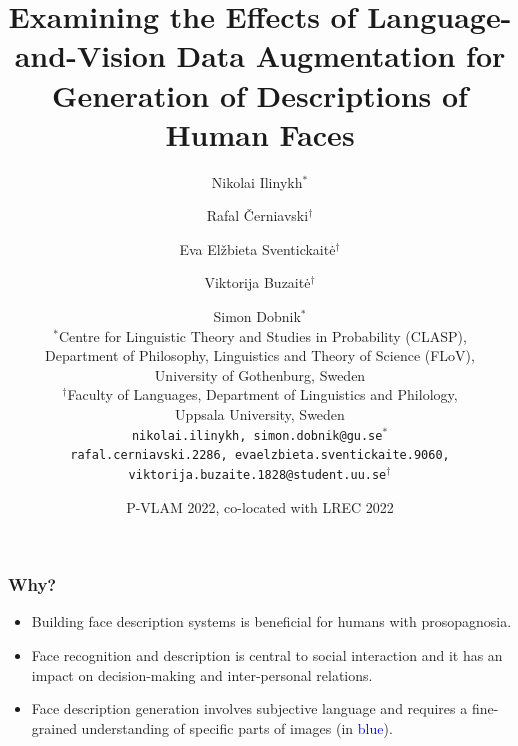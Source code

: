 \documentclass[aspectratio=1610]{beamer} %
\title{Examining the Effects of Language-and-Vision Data Augmentation for Generation of Descriptions of Human Faces}
\author{
Nikolai Ilinykh$^{\ast}$ \and Rafal Černiavski$^{\dagger}$ \and Eva Elžbieta Sventickaitė$^{\dagger}$ \\ \and Viktorija Buzaitė$^{\dagger}$ \and Simon Dobnik$^{\ast}$ \\
	\vspace{.2cm}
        \small $^{\ast}$Centre for Linguistic Theory and Studies in Probability (CLASP), \\
        Department of Philosophy, Linguistics and Theory of Science (FLoV), \\
        University of Gothenburg, Sweden \\
	$^{\dagger}$Faculty of Languages, Department of Linguistics and Philology, \\ Uppsala University, Sweden \\
	\vspace{.2cm}
	\texttt{nikolai.ilinykh, simon.dobnik@gu.se}$^{\ast}$ \\
	\texttt{rafal.cerniavski.2286, evaelzbieta.sventickaite.9060, viktorija.buzaite.1828@student.uu.se}$^{\dagger}$ \\
      }
\date{P-VLAM 2022, co-located with LREC 2022}
\begin{document}
\frame[plain]{\titlepage}



\begin{frame}
\frametitle{Why?}

\begin{itemize}

\vspace{.7cm}
\item Building face description systems is beneficial for humans with prosopagnosia.
\pause
\item Face recognition and description is central to social interaction and it has an impact on decision-making and inter-personal relations.
\pause
\item Face description generation involves subjective language and requires a fine-grained understanding of specific parts of images (in \textcolor{blue}{blue}).

\end{itemize}


\end{frame}
\end{document}
